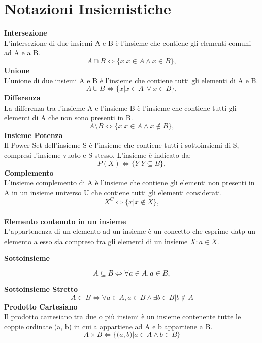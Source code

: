 \documentclass{article}
\begin{document}
\section{Notazioni Insiemistiche}
\textbf{Intersezione}
\\
L’intersezione di due insiemi A e B è l’insieme che contiene gli elementi comuni ad A e a B.
\begin{equation}
  A \cap B \iff \{x | x \in A \wedge x \in B\},
\end{equation}
\textbf{Unione}
\\
L’unione di due insiemi A e B è l’insieme che contiene tutti gli elementi di A e B.
\begin{equation}
  A \cup B \iff \{x | x \in A \ \lor x \in B\},
\end{equation}
\textbf{Differenza}
\\
La differenza tra l’insieme A e l’insieme B è l’insieme che contiene tutti gli elementi di A che non sono presenti in B.
\begin{equation}
  A \setminus B \iff \{x | x  \in A \wedge x \not \in B\},
\end{equation}
\textbf{Insieme Potenza}
\\
Il Power Set dell’insieme S è l’insieme che contiene tutti i sottoinsiemi di S, compresi l’insieme vuoto e S stesso. L’insieme è indicato da: 
\begin{equation}
  P(X) \iff \{Y | Y \subseteq B\},
\end{equation}
\textbf{Complemento}
\\
L’insieme complemento di A è l’insieme che contiene gli elementi non presenti in A in un insieme universo U che contiene tutti gli elementi considerati.
\begin{equation}
  X^C \iff \{x | x \not \in X\},
\end{equation}
\\
\textbf{Elemento contenuto in un insieme}
\\
L'appartenenza di un elemento ad un insieme è un concetto che esprime datp un elemento a esso sia compreso tra gli elementi di un insieme $X: a \in X.$ 

\textbf{Sottoinsieme}
\begin{center}

\begin{equation}
  A \subseteq B \iff \forall a \in A,a \in B,
\end{equation}
\end{center}

\textbf{Sottoinsieme Stretto}
\begin{equation}
  A \subset B \iff \forall a \in A,a \in B \wedge \exists b \in B | b \not \in A
\end{equation}
\textbf{Prodotto Cartesiano}
\\
Il prodotto cartesiano tra due o più insiemi è un insieme contenente tutte le coppie ordinate (a, b) in cui a appartiene ad A e b appartiene a B.
\begin{equation}
  A \times B \iff \{ \big(a,b \big) |a \in A \wedge b \in B \}
\end{equation}
\end{document}
